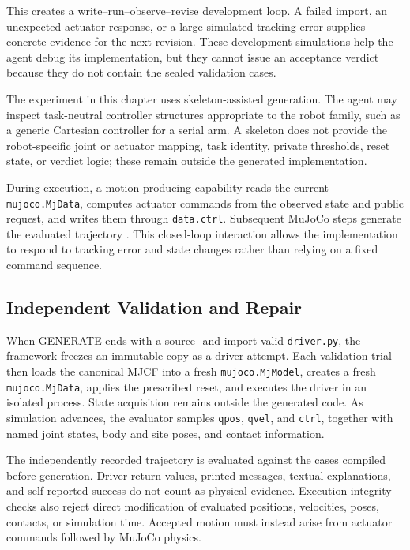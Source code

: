 This creates a write--run--observe--revise development loop. A failed import,
an unexpected actuator response, or a large simulated tracking error supplies
concrete evidence for the next revision. These development simulations help
the agent debug its implementation, but they cannot issue an acceptance
verdict because they do not contain the sealed validation cases.

The experiment in this chapter uses skeleton-assisted generation. The agent
may inspect task-neutral controller structures appropriate to the robot
family, such as a generic Cartesian controller for a serial arm. A skeleton
does not provide the robot-specific joint or actuator mapping, task identity,
private thresholds, reset state, or verdict logic; these remain outside the
generated implementation.

During execution, a motion-producing capability reads the current
\texttt{mujoco.MjData}, computes actuator commands from the observed state and
public request, and writes them through \texttt{data.ctrl}. Subsequent MuJoCo
steps generate the evaluated trajectory \citep{todorov2012mujoco}. This
closed-loop interaction allows the implementation to respond to tracking error
and state changes rather than relying on a fixed command sequence.

\subsection{Independent Validation and Repair}

When GENERATE ends with a source- and import-valid \texttt{driver.py}, the
framework freezes an immutable copy as a driver attempt. Each validation trial
then loads the canonical MJCF into a fresh \texttt{mujoco.MjModel}, creates a
fresh \texttt{mujoco.MjData}, applies the prescribed reset, and executes the
driver in an isolated process. State acquisition remains outside the generated
code. As simulation advances, the evaluator samples \texttt{qpos},
\texttt{qvel}, and \texttt{ctrl}, together with named joint states, body and
site poses, and contact information.

The independently recorded trajectory is evaluated against the cases compiled
before generation. Driver return values, printed messages, textual
explanations, and self-reported success do not count as physical evidence.
Execution-integrity checks also reject direct modification of evaluated
positions, velocities, poses, contacts, or simulation time. Accepted motion
must instead arise from actuator commands followed by MuJoCo physics.

